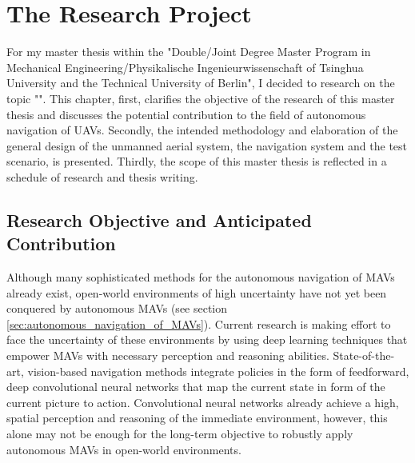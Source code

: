 
\chapter{The Research Project} \label{cha:research_project} %

For my master thesis within the  
"Double/Joint Degree Master Program in Mechanical Engineering/Physikalische Ingenieurwissenschaft 
of Tsinghua University and the Technical University of Berlin",
I decided to research on the topic "\ttitle".
This chapter, first, clarifies the objective of the research of this master thesis and
discusses the potential contribution to the field of autonomous navigation of UAVs.
Secondly, the intended methodology and elaboration of
the general design of the unmanned aerial system, the navigation system and the test scenario, is presented.
Thirdly, the scope of this master thesis is reflected in a schedule of research and thesis writing.











\section{Research Objective and Anticipated Contribution}

Although many sophisticated methods for the autonomous navigation of MAVs already exist,
open-world environments of high uncertainty have not yet been conquered by autonomous MAVs (see section \ref{sec:autonomous_navigation_of_MAVs}).
Current research is making effort to face the uncertainty of these environments by using deep learning techniques 
that empower MAVs with necessary perception and reasoning abilities.
State-of-the-art, vision-based navigation methods integrate policies in the form of feedforward, deep convolutional neural networks
that map the current state in form of the current picture to action.
Convolutional neural networks already achieve a high, spatial perception and reasoning of the immediate environment, however, 
this alone may not be enough for the long-term objective to robustly apply autonomous MAVs in open-world environments.

